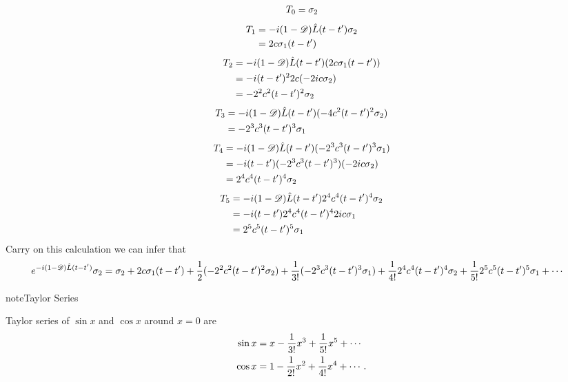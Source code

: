 \documentclass[letterpaper,12pt,english]{sphinxmanual}
\begin{document}
\begin{gather}
\begin{split}T_0 = \sigma_2\end{split}\notag
\end{gather}\begin{gather}
\begin{split}T_1 &= -i(1-\mathscr D)\hat L (t-t') \sigma_2 \\
& = 2c\sigma_1 (t-t')\end{split}\notag
\end{gather}\begin{gather}
\begin{split}T_2 & = -i(1-\mathscr D)\hat L (t-t') (2c\sigma_1 (t-t')) \\
& = -i(t-t')^2 2c(-2ic\sigma_2) \\
& = - 2^2 c^2 (t-t')^2 \sigma_2\end{split}\notag
\end{gather}\begin{gather}
\begin{split}T_3 & = -i(1-\mathscr D)\hat L (t-t') (- 4c^2 (t-t')^2 \sigma_2) \\
& = -2^3c^3(t-t')^3\sigma_1\end{split}\notag
\end{gather}\begin{gather}
\begin{split}T_4 & = -i(1-\mathscr D)\hat L (t-t') (-2^3c^3(t-t')^3\sigma_1) \\
& = -i (t-t') (-2^3 c^3(t-t')^3) (-2ic\sigma_2) \\
& = 2^4 c^4 (t-t')^4 \sigma_2\end{split}\notag
\end{gather}\begin{gather}
\begin{split}T_5 & = -i(1-\mathscr D)\hat L (t-t') 2^4 c^4 (t-t')^4 \sigma_2 \\
& = -i(t-t')2^4 c^4 (t-t')^4 2ic\sigma_1 \\
& = 2^5c^5 (t-t')^5 \sigma_1\end{split}\notag
\end{gather}
Carry on this calculation we can infer that
\begin{gather}
\begin{split}e^{-i(1-\mathscr D)\hat L (t-t')} \sigma_2 &= \sigma_2 + 2c\sigma_1 (t-t') + \frac{1}{2}(- 2^2 c^2 (t-t')^2 \sigma_2) +  \frac{1}{3!}(-2^3c^3(t-t')^3\sigma_1) + \frac{1}{4!} 2^4 c^4 (t-t')^4 \sigma_2  + \frac{1}{5!} 2^5c^5 (t-t')^5 \sigma_1 +  \cdots\end{split}\notag
\end{gather}
\begin{notice}{note}{Taylor Series}

Taylor series of \(\sin x\) and \(\cos x\) around \(x=0\) are
\begin{gather}
\begin{split}\sin x &= x - \frac{1}{3!} x^3 + \frac{1}{5!}x^5 + \cdots \\
\cos x & = 1 -\frac{1}{2!} x^2 + \frac{1}{4!} x^4 + \cdots .\end{split}\notag
\end{gather}\end{notice}
\end{document}

